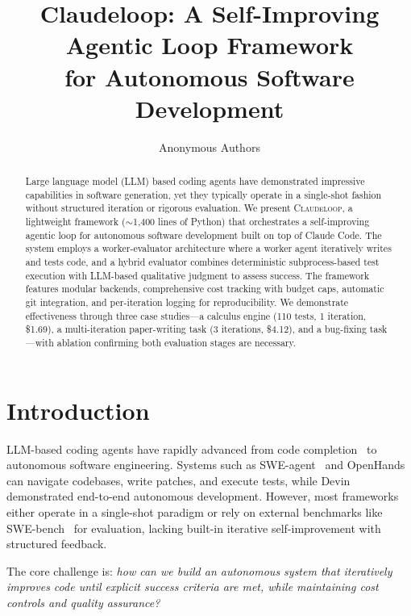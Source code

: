 \documentclass{article}
\title{Claudeloop: A Self-Improving Agentic Loop Framework\\for Autonomous Software Development}
\author{
  Anonymous Authors
}
\begin{document}
\maketitle

\begin{abstract}
Large language model (LLM) based coding agents have demonstrated impressive capabilities in software generation, yet they typically operate in a single-shot fashion without structured iteration or rigorous evaluation.
We present \textsc{Claudeloop}, a lightweight framework ($\sim$1,400 lines of Python) that orchestrates a self-improving agentic loop for autonomous software development built on top of Claude Code.
The system employs a worker-evaluator architecture where a worker agent iteratively writes and tests code, and a hybrid evaluator combines deterministic subprocess-based test execution with LLM-based qualitative judgment to assess success.
The framework features modular backends, comprehensive cost tracking with budget caps, automatic git integration, and per-iteration logging for reproducibility.
We demonstrate effectiveness through three case studies---a calculus engine (110 tests, 1 iteration, \$1.69), a multi-iteration paper-writing task (3 iterations, \$4.12), and a bug-fixing task---with ablation confirming both evaluation stages are necessary.
\end{abstract}

\section{Introduction}

LLM-based coding agents have rapidly advanced from code completion~\cite{chen2021codex} to autonomous software engineering.
Systems such as SWE-agent~\cite{yang2024sweagent} and OpenHands~\cite{wang2024openhands} can navigate codebases, write patches, and execute tests, while Devin~\cite{cognition2024devin} demonstrated end-to-end autonomous development.
However, most frameworks either operate in a single-shot paradigm or rely on external benchmarks like SWE-bench~\cite{jimenez2024swebench} for evaluation, lacking built-in iterative self-improvement with structured feedback.

The core challenge is: \emph{how can we build an autonomous system that iteratively improves code until explicit success criteria are met, while maintaining cost controls and quality assurance?}
\end{document}
